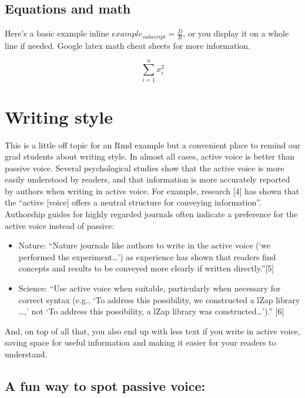 \documentclass[]{elsarticle} %
\providecommand{\tightlist}{%
  \setlength{\itemsep}{0pt}\setlength{\parskip}{0pt}}
\theoremstyle{definition}
\theoremstyle{definition}
\theoremstyle{definition}
\theoremstyle{remark}
\begin{document}
\hypertarget{equations-and-math}{%
\subsection{Equations and math}\label{equations-and-math}}

Here's a basic example inline \(example_{subscript} = \frac{D}{R}\), or
you display it on a whole line if needed. Google latex math cheat sheets
for more information.

\[\sum_{i=1}^{n}{x_i^2}\]

\hypertarget{writing-style}{%
\section{Writing style}\label{writing-style}}

This is a little off topic for an Rmd example but a convenient place to
remind our grad students about writing style. In almost all cases,
active voice is better than passive voice. Several psychological studies
show that the active voice is more easily understood by readers, and
that information is more accurately reported by authors when writing in
active voice. For example, research {[}4{]} has shown that the ``active
{[}voice{]} offers a neutral structure for conveying information''.
Authorship guides for highly regarded journals often indicate a
preference for the active voice instead of passive:

\begin{itemize}
\tightlist
\item
  Nature: ``Nature journals like authors to write in the active voice
  (`we performed the experiment\ldots{}') as experience has shown that
  readers find concepts and results to be conveyed more clearly if
  written directly.''{[}5{]}
\item
  Science: ``Use active voice when suitable, particularly when necessary
  for correct syntax (e.g., `To address this possibility, we constructed
  a lZap library \ldots{},' not `To address this possibility, a lZap
  library was constructed\ldots{}').'' {[}6{]}
\end{itemize}

And, on top of all that, you also end up with less text if you write in
active voice, saving space for useful information and making it easier
for your readers to understand.

\hypertarget{a-fun-way-to-spot-passive-voice}{%
\subsection{A fun way to spot passive
voice:}\label{a-fun-way-to-spot-passive-voice}}
\end{document}
